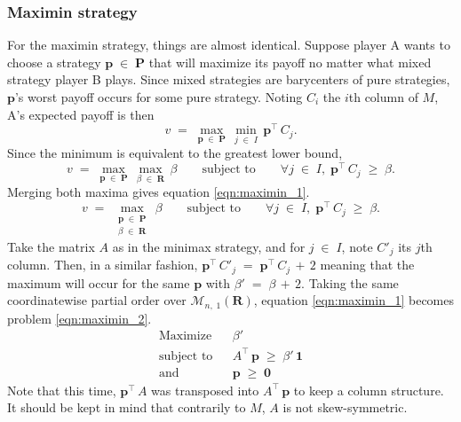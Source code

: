 \documentclass{report}
\theoremstyle{definition}
\theoremstyle{plain}
\begin{document}
\subsubsection{Maximin strategy}
For the maximin strategy, things are almost identical. Suppose player A wants
to choose a strategy $\mathbf p\;\in\;\mathbf P$ that will maximize its payoff
no matter what mixed strategy player B plays. Since mixed strategies are
barycenters of pure strategies, $\mathbf p$'s worst payoff occurs for some pure
strategy. Noting $C_i$ the $i$th column of $M$, A's expected payoff is then
\[
	v\;=\;\max_{\mathbf p\;\in\;\mathbf P}\,
		\min_{j\;\in\;I}\,\mathbf p^\top\,C_j.
\]
Since the minimum is equivalent to the greatest lower bound,
\[
	v\;=\;\max_{\mathbf p\;\in\;\mathbf P}\,
		\max_{\beta\;\in\;\mathbf R}\,\beta
		\qquad\text{subject to}\qquad
		\forall j\;\in\;I,\;\mathbf p^\top\,C_j\;\geqslant\;\beta.
\]
Merging both maxima gives equation \ref{eqn:maximin_1}.
\begin{equation}
	v\;=\;\max_{\substack{\mathbf p\;\in\;\mathbf P\\\beta\;\in\;\mathbf R}}\,\beta
		\qquad\text{subject to}\qquad
		\forall j\;\in\;I,\;\mathbf p^\top\,C_j\;\geqslant\;\beta.
	\label{eqn:maximin_1}
\end{equation}
Take the matrix $A$ as in the minimax strategy, and for $j\;\in\;I$, note $C'_j$
its $j$th column. Then, in a similar fashion,
$\mathbf p^\top\,C'_j\;=\;\mathbf p^\top\,C_j\,+\,2$ meaning that the maximum
will occur for the same $\mathbf p$ with $\beta'\;=\;\beta\,+\,2$. Taking the
same coordinatewise partial order over
$\mathscr M_{n,\;1}\left(\mathbf R\right)$, equation \ref{eqn:maximin_1} becomes
problem \ref{eqn:maximin_2}.
\begin{equation}
	\begin{array}{lll}
		\text{Maximize} & & \beta' \\
		\text{subject to} & &
			A^\top\,\mathbf p\;\geqslant\;\beta'\,\mathbf 1 \\
		\text{and} & & \mathbf p\;\geqslant\;\mathbf 0
	\end{array}
	\label{eqn:maximin_2}
\end{equation}
Note that this time, $\mathbf p^\top\,A$ was transposed into $A^\top\,\mathbf p$
to keep a column structure. It should be kept in mind that contrarily to $M$,
$A$ is not skew-symmetric.
\end{document}
